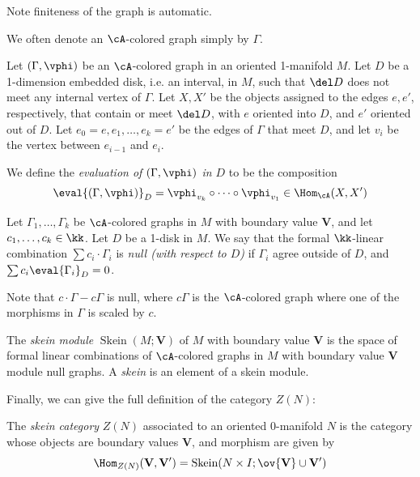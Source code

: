 \documentclass[12pt]{article}
\newcommand{\VV}{{\mathbf{V}}}
\DeclareMathOperator{\Skein}{Skein}
\begin{document}
Note finiteness of the graph is automatic.

We often denote an $\cA$-colored graph simply by $\Gamma$.

\begin{definition}
\label{d:local-ev}
Let $(\Gamma,\vphi)$ be an $\cA$-colored graph
in an oriented 1-manifold $M$.
Let $D$ be a 1-dimension embedded disk, i.e. an interval,
in $M$, such that $\del D$ does not meet any internal vertex
of $\Gamma$.
Let $X,X'$ be the objects assigned to the edges $e,e'$,
respectively, that contain or meet $\del D$,
with $e$ oriented into $D$, and $e'$ oriented out of $D$.
Let $e_0 = e, e_1,\ldots,e_k = e'$ be the edges
of $\Gamma$ that meet $D$, and let
$v_i$ be the vertex between $e_{i-1}$ and $e_i$.

We define the \emph{evaluation of $(\Gamma,\vphi)$ in $D$}
to be the composition
\[
\eval{(\Gamma,\vphi)}_D
= \vphi_{v_k} \circ \cdots \circ \vphi_{v_1}
\in \Hom_\cA(X,X')
\]
\end{definition}


\begin{definition}
\label{d:null-graph}
Let $\Gamma_1,\ldots,\Gamma_k$ be $\cA$-colored graphs in $M$
with boundary value $\VV$,
and let $c_1,\ldots,c_k \in \kk$.
Let $D$ be a 1-disk in $M$.
We say that the formal $\kk$-linear combination
$\sum c_i \cdot \Gamma_i$ is
\emph{null (with respect to $D$)}
if $\Gamma_i$ agree outside of $D$,
and $\sum c_i \eval{\Gamma_i}_D = 0$.
\end{definition}

Note that $c \cdot \Gamma - c\Gamma$ is null,
where $c\Gamma$ is the $\cA$-colored graph
where one of the morphisms in $\Gamma$ is scaled by $c$.

\begin{definition}
\label{d:skein}
The \emph{skein module} $\Skein(M;\VV)$
of $M$ with boundary value $\VV$
is the space of formal linear combinations of
$\cA$-colored graphs in $M$ with boundary value $\VV$
module null graphs.
A \emph{skein} is an element of a skein module.
\end{definition}


Finally, we can give the full definition of the category
$Z(N)$:

\begin{definition}
\label{d:skein-category}
The \emph{skein category} $Z(N)$ associated to an
oriented 0-manifold $N$
is the category whose objects are boundary values $\VV$,
and morphism are given by
\[
\Hom_{Z(N)}(\VV,\VV') = \Skein(N \times I; \ov{\VV} \cup \VV')
\]
\end{definition}
\end{document}

